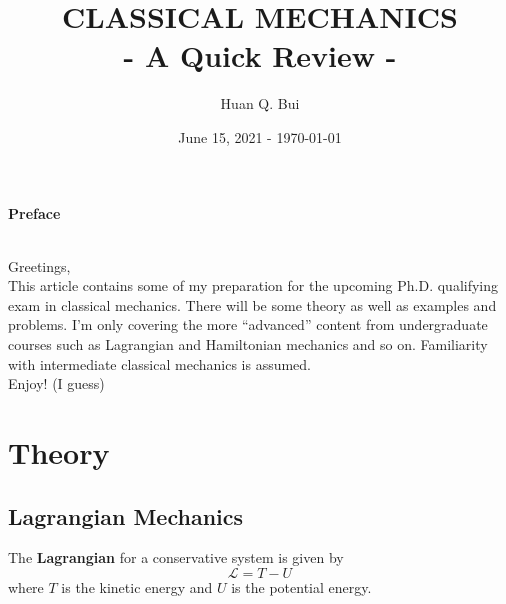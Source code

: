 \documentclass{book}
\theoremstyle{definition}
\newcommand{\lag}{\mathcal{L}}
\begin{document}
\begin{titlepage}\centering
 \clearpage
 \title{{\textsc{\textbf{CLASSICAL MECHANICS}}}\\ \smallskip - A Quick Review - \\}
 \author{\bigskip Huan Q. Bui}
 \date{June 15, 2021 -   \today}
 \maketitle
 \thispagestyle{empty}
\end{titlepage}




\noindent \textbf{Preface}


$\,$\\


\noindent Greetings, \\

This article contains some of my preparation for the upcoming Ph.D. qualifying exam in classical mechanics. There will be some theory as well as examples and problems. I'm only covering the more ``advanced'' content from undergraduate courses such as Lagrangian and Hamiltonian mechanics and so on. Familiarity with intermediate classical mechanics is assumed. \\

\noindent Enjoy! (I guess)



\newpage







\chapter{Theory}






\section{Lagrangian Mechanics}

The \textbf{Lagrangian} for a conservative system is given by 
\begin{equation*}
\lag = T - U
\end{equation*}
where $T$ is the kinetic energy and $U$ is the potential energy. \\
\end{document}
